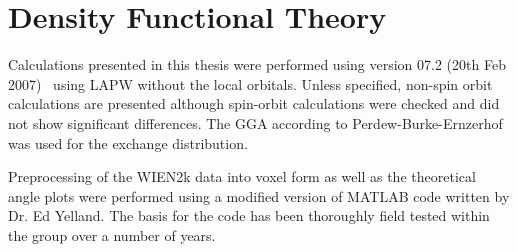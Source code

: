 
\section{Density Functional Theory}
\label{Sec:Exp:Dft}

Calculations presented in this thesis were performed using \WIEN version 07.2 (20th Feb 2007)~\cite{Blaha2001} using \ac{LAPW} without the local orbitals. Unless specified, non-spin orbit calculations are presented although spin-orbit calculations were checked and did not show significant differences. The \ac{GGA} according to Perdew-Burke-Ernzerhof~\cite{Perdew1996} was used for the exchange distribution.

Preprocessing of the WIEN2k data into voxel form as well as the theoretical angle plots were performed using a modified version of MATLAB code written by Dr. Ed Yelland. The basis for the code has been thoroughly field tested within the group over a number of years.
